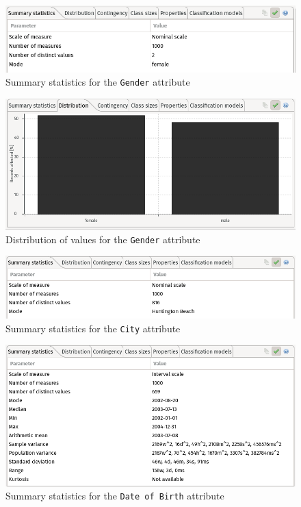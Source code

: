 \documentclass[a4paper, 11pt]{article}
\begin{document}
\vspace{2\baselineskip}

\begin{figure}[H]
    \centering
    \includegraphics[width=.9\textwidth]{img/gender.png}
    \caption{Summary statistics for the \texttt{Gender} attribute}
\end{figure}

\begin{figure}[H]
    \centering
    \includegraphics[width=.9\textwidth]{img/gender-distr.png}
    \caption{Distribution of values for the \texttt{Gender} attribute}
\end{figure}

\begin{figure}[H]
    \centering
    \includegraphics[width=.9\textwidth]{img/city.png}
    \caption{Summary statistics for the \texttt{City} attribute}
\end{figure}

\begin{figure}[H]
    \centering
    \includegraphics[width=.9\textwidth]{img/birth-date.png}
    \caption{Summary statistics for the \texttt{Date of Birth} attribute}
\end{figure}
\end{document}
